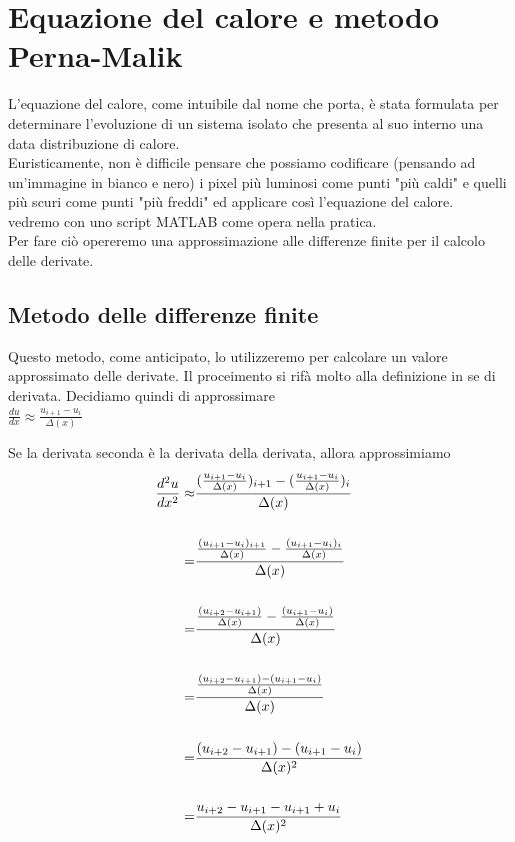 \chapter{Equazione del calore e metodo Perna-Malik}

L'equazione del calore, come intuibile dal nome che porta, è stata formulata per determinare l'evoluzione di un sistema isolato che presenta al suo interno una data distribuzione di calore.\\

Euristicamente, non è difficile pensare che possiamo codificare (pensando ad un'immagine in bianco e nero) i pixel più luminosi come punti "più caldi" e quelli più scuri come punti "più freddi" ed applicare così l'equazione del calore.\\

vedremo con uno script MATLAB come opera nella pratica. \\
Per fare ciò opereremo una approssimazione alle differenze finite per il calcolo delle derivate.\\

\section{Metodo delle differenze finite}
Questo metodo, come anticipato, lo utilizzeremo per calcolare un valore approssimato delle derivate. Il proceimento si rifà molto alla definizione in se di derivata. Decidiamo quindi di approssimare \\
\vspace{2pt}
\centering 
$\frac{du}{dx} \approx \frac{u_{i+1} - u_i}{\Delta(x)} $\\
\vspace{2pt}
\raggedright
Se la derivata seconda è la derivata della derivata, allora approssimiamo \\
\vspace{3cm}
\centering                      
\begin{align*}
\frac{d^2u}{dx^2} \approx &
\frac{
(\frac{u_{i+1} - u_i}{\Delta(x)})_{i+1} 
- 
(\frac{u_{i+1} - u_i}{\Delta(x)})_i
}{\Delta(x)}
\\
\vline
\\
= &
\frac{
\frac{(u_{i+1} - u_i)_{i+1}}{\Delta(x)} 
-   
\frac{(u_{i+1} - u_i)_i}{\Delta(x)}
}{\Delta(x)}
\\
\vline 
\\
= &
\frac{
\frac{(u_{i+2} - u_{i+1})}{\Delta(x)} 
- 
\frac{(u_{i+1} - u_i)}{\Delta(x)}
}{\Delta(x)}
\\
\vline 
\\
= &
\frac{
\frac{(u_{i+2} - u_{i+1}) 
- 
(u_{i+1} - u_i)}{\Delta(x)}
}{\Delta(x)}
\\
\vline
\\
= &
\frac{
(u_{i+2} - u_{i+1}) 
- 
(u_{i+1} - u_i)}
{\Delta(x)^2}
\\
\vline 
\\
= &
\frac{
 u_{i+2} - u_{i+1} 
-u_{i+1} + {u_i}}
{\Delta(x)^2}
\\
\end{align*}

